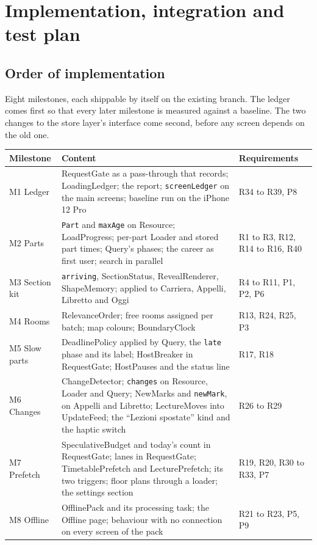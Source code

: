 \section{Implementation, integration and test plan}

\subsection{Order of implementation}
Eight milestones, each shippable by itself on the existing branch. The ledger
comes first so that every later milestone is measured against a baseline. The two
changes to the store layer's interface come second, before any screen depends on
the old one.

\begin{center}\small
\begin{tabularx}{\linewidth}{@{}l X l@{}}
  \toprule
  Milestone & Content & Requirements \\
  \midrule
  M1 Ledger & RequestGate as a pass-through that records; LoadingLedger; the report; \texttt{screenLedger} on the main screens; baseline run on the iPhone 12 Pro & R34 to R39, P8 \\
  M2 Parts & \texttt{Part} and \texttt{maxAge} on Resource; LoadProgress; per-part Loader and stored part times; Query's phases; the career as first user; search in parallel & R1 to R3, R12, R14 to R16, R40 \\
  M3 Section kit & \texttt{arriving}, SectionStatus, RevealRenderer, ShapeMemory; applied to Carriera, Appelli, Libretto and Oggi & R4 to R11, P1, P2, P6 \\
  M4 Rooms & RelevanceOrder; free rooms assigned per batch; map colours; BoundaryClock & R13, R24, R25, P3 \\
  M5 Slow parts & DeadlinePolicy applied by Query, the \texttt{late} phase and its label; HostBreaker in RequestGate; HostPauses and the status line & R17, R18 \\
  M6 Changes & ChangeDetector; \texttt{changes} on Resource, Loader and Query; NewMarks and \texttt{newMark}, on Appelli and Libretto; LectureMoves into UpdateFeed; the ``Lezioni spostate'' kind and the haptic switch & R26 to R29 \\
  M7 Prefetch & SpeculativeBudget and today's count in RequestGate; lanes in RequestGate; TimetablePrefetch and LecturePrefetch; its two triggers; floor plans through a loader; the settings section & R19, R20, R30 to R33, P7 \\
  M8 Offline & OfflinePack and its processing task; the Offline page; behaviour with no connection on every screen of the pack & R21 to R23, P5, P9 \\
  \bottomrule
\end{tabularx}
\end{center}

